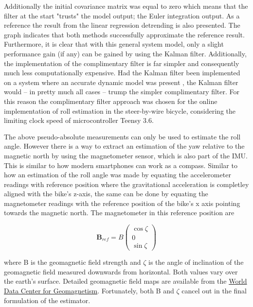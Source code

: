 Additionally the initial covariance matrix was equal to zero which means that the filter at the start "trusts" the model output; the Euler integration output. As a reference the result from the linear regression detrending is also presented. The graph indicates that both methods successfully approximate the reference result. Furthermore, it is clear that with this general system model, only a slight performance gain (if any) can be gained by using the Kalman filter. Additionally, the implementation of the complimentary filter is far simpler and consequently much less computationally expensive. Had the Kalman filter been implemented on a system where  an accurate dynamic model was present , the Kalman filter would – in pretty much all cases – trump the simpler complimentary filter. For this reason the complimentary filter approach was chosen for the online implementation of roll estimation in the steer-by-wire bicycle, considering the limiting clock speed of microcontroller Teensy 3.6.

The above pseudo-absolute measurements can only be used to estimate the roll angle. However there is a way to extract an estimation of the yaw relative to the magnetic north by using the magnetometer sensor, which is also part of the IMU. This is similar to how modern smartphones can work as a compass. Similar to how an estimation of the roll angle was made by equating the accelerometer readings with  reference position where the gravitational acceleration is completley aligned with the bike's z-axis, the same can be done by equating the magnetometer readings with the reference position of the bike's x axis pointing towards the magnetic north. The magnetometer in this reference position are 

\begin{equation}
\boldsymbol{B}_{ref}=B\left(\begin{array}{c}{\cos \zeta} \\ {0} \\ {\sin \zeta}\end{array}\right)
\end{equation}

where B is the geomagnetic field strength and \ensuremath{\zeta} is the angle of inclination of the geomagnetic field measured downwards from horizontal. Both values vary over the earth's surface. Detailed geomagnetic field maps are available from the \href{http://wdc.kugi.kyoto-u.ac.jp/igrf/}{World Data Center for Geomagnetism}. Fortunately, both B and \ensuremath{\zeta} cancel out in the final formulation of the estimator.


